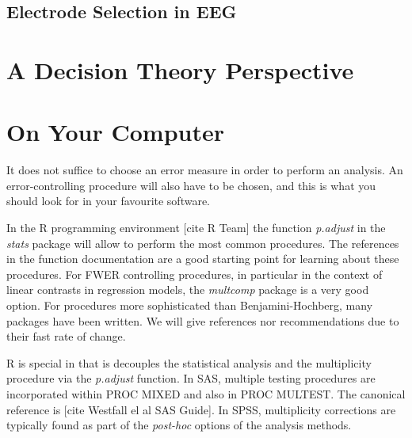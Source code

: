\documentclass[draft,12pt]{article}
\begin{document}
\subsection{\label{eg:electrode_selection}Electrode Selection in EEG}






\section{A Decision Theory Perspective}


\appendix

\section{\label{sec:on_your_pc} On Your Computer}
It does not suffice to choose an error measure in order to perform an analysis. An error-controlling procedure will also have to be chosen, and this is what you should look for in your favourite software. 

In the R programming environment [cite R Team] the function \emph{p.adjust} in the \emph{stats} package will allow to perform the most common procedures. The references in the function documentation are a good starting point for learning about these procedures. For FWER controlling procedures, in particular in the context of linear contrasts in regression models, the \emph{multcomp} package is a very good option. For procedures more sophisticated than Benjamini-Hochberg, many packages have been written. We will give references nor recommendations due to their fast rate of change.

R is special in that is decouples the statistical analysis and the multiplicity procedure via the \emph{p.adjust} function. In SAS, multiple testing procedures are incorporated within PROC MIXED and also in PROC MULTEST.  The canonical reference is [cite Westfall el al SAS Guide]. In SPSS, multiplicity corrections are typically found as part of the \emph{post-hoc} options of the analysis methods.
\end{document}
